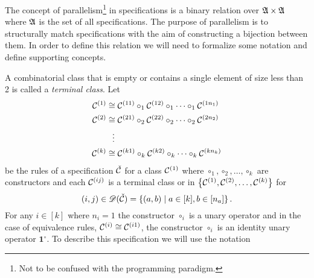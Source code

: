 \label{ch:parallel}
The concept of parallelism\footnote{Not to be confused with the programming paradigm.} in specifications is a binary relation over $\mathfrak{A} \times \mathfrak{A}$ where $\mathfrak{A}$ is the set of all specifications. The purpose of parallelism is to structurally match specifications with the aim of constructing a bijection between them. In order to define this relation  we will need to formalize some notation and define supporting concepts.

A combinatorial class that is empty or contains a single element of size less than 2 is called a \emph{terminal class}. Let
\begin{align*}
    \mathcal{C}^{\left(1\right)} &\cong \mathcal{C}^{\left(11\right)} \circ_1 \mathcal{C}^{\left(12\right)} \circ_1 \dotsm \circ_1 \mathcal{C}^{\left(1n_1\right)}\\
    \mathcal{C}^{\left(2\right)} &\cong \mathcal{C}^{\left(21\right)} \circ_2 \mathcal{C}^{\left(22\right)} \circ_2 \dotsm \circ_2 \mathcal{C}^{\left(2n_2\right)}\\
    &\hspace{0.25cm}\vdots\\
    \mathcal{C}^{\left(k\right)} &\cong \mathcal{C}^{\left(k1\right)} \circ_k \mathcal{C}^{\left(k2\right)} \circ_k \dotsm \circ_k \mathcal{C}^{\left(kn_k\right)}\\
\end{align*}
be the rules of a specification $\check{\mathcal{C}}$ for a class $\mathcal{C}^{\left(1\right)}$ where $\circ_1,\circ_2,\dotsc,\circ_k$ are constructors and each $\mathcal{C}^{\left(ij\right)}$ is a terminal class or in $\left\{\mathcal{C}^{\left(1\right)}, \mathcal{C}^{\left(2\right)}, \dotsc, \mathcal{C}^{\left(k\right)}\right\}$ for
\[
    (i,j) \in \mathscr{D}(\check{\mathcal{C}}) = \left\{(a,b) \mid a \in [k], b \in [n_a]\right\}.
\]
For any $i\in[k]$ where $n_i=1$ the constructor $\circ_i$ is a unary operator and in the case of equivalence rules, $\mathcal{C}^{\left(i\right)} \cong \mathcal{C}^{\left(i1\right)}$, the constructor $\circ_i$ is an identity unary operator $\mathbf{1}^\circ$. To describe this specification we will use the notation 
